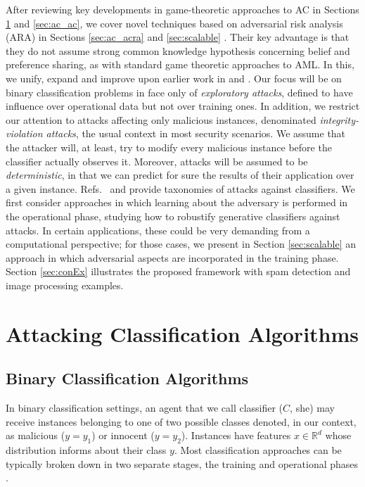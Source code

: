 After reviewing key developments in game-theoretic approaches to AC in Sections \ref{sec:ac_acr} and \ref{sec:ac_ac}, we cover novel techniques based on adversarial risk analysis (ARA) in Sections  \ref{sec:ac_acra} and \ref{sec:scalable}  \cite{adversarialRiskAnalysis2009}. Their key advantage is that they do not assume strong common knowledge hypothesis concerning belief and preference sharing, as with standard game theoretic approaches to AML. In this, we unify, expand
and improve upon earlier work in \cite{naveiro2018adversarial} and
\cite{gallego2020protecting}.
Our focus will be on binary classification
 problems in face only of {\em exploratory attacks}, defined to have influence over operational data but not over training ones. In addition, we restrict our attention to attacks affecting only malicious instances, denominated \textit{integrity-violation attacks}, the usual context in most security scenarios. We assume that the attacker will, at least, try to modify every malicious instance before the
classifier actually observes it. 
Moreover, attacks will be assumed to be {\em deterministic},
in that we can predict for sure the results of their 
application over a given instance.
Refs.~\cite{AdversarialMachineLearning2011} and \cite{Barreno2006} provide taxonomies of attacks against classifiers. %
%
We first consider approaches in which learning about the adversary is performed in the
operational phase, studying how to robustify generative classifiers against attacks. In certain applications, these  could be very demanding from a computational perspective; for those cases, we present in Section \ref{sec:scalable} an  
approach in which adversarial aspects are incorporated in the training phase.
Section \ref{sec:conEx} illustrates the proposed framework
with spam detection and image processing examples.

\section{Attacking Classification Algorithms}\label{sec:ac_acr}

\subsection{Binary Classification Algorithms}\label{sec2.1}

In binary classification settings, an agent that we call classifier ($C$, she)
may receive instances belonging to one of two possible  classes denoted, in our context, as malicious ($y=y_1$) or innocent ($y=y_2$).  Instances have  features $x \in \mathbb{R}^d$ whose distribution informs about their class $y$.  Most classification approaches can be typically broken down in two separate stages, the training and operational phases \cite{bishop2006pattern}.
%
%

